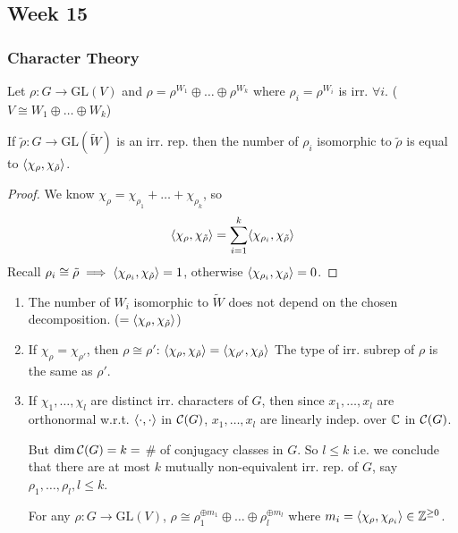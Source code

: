 \subsection{Week 15}
\subsubsection{Character Theory }

\begin{prop}
  Let $\rho: G\to \text{GL}(V)$ and
  $\rho = \rho^{W_1} \oplus \dots \oplus \rho^{W_k}$ where
  $\rho_i = \rho^{W_i}$ is irr. $\forall i$.
  ($V \cong W_1 \oplus\dots\oplus W_k$)

  If $\tilde{\rho}: G\to \text{GL}(\tilde{W})$ is an irr. rep. then the number
  of $\rho_i$ isomorphic to $\tilde{\rho}$ is equal to
  $\langle\chi_\rho, \chi_{\tilde{\rho}}\rangle$.
  \begin{proof}
    We know $\chi_\rho = \chi_{\rho_1} + \dots + \chi_{\rho_k}$, so
    \[
      \langle\chi_\rho, \chi_{\tilde{\rho}}\rangle
      = \sum_{i=1}^k \langle\chi_{\rho_i}, \chi_{\tilde{\rho}}\rangle
    \]
    Recall $\rho_i \cong \tilde{\rho} \implies
    \langle\chi_{\rho_i}, \chi_{\tilde{\rho}}\rangle = 1$, otherwise
    $\langle\chi_{\rho_i}, \chi_{\tilde{\rho}}\rangle = 0$.
  \end{proof}
\end{prop}

\begin{remark} \mbox{}
  \begin{enumerate}
    \item The number of $W_i$ isomorphic to $\tilde{W}$ does not depend
      on the chosen decomposition. ($= \langle\chi_\rho, \chi_{\tilde{\rho}}\rangle$)
    \item If $\chi_\rho = \chi_{\rho'}$, then $\rho \cong \rho'$:
      $\langle\chi_\rho, \chi_{\tilde{\rho}}\rangle = \langle\chi_{\rho'}, \chi_{\tilde{\rho}}\rangle$
      The type of irr. subrep of $\rho$ is the same as $\rho'$.

    \item If $\chi_1, \dots, \chi_l$ are distinct irr. characters of $G$, then
      since $x_1, \dots, x_l$ are orthonormal w.r.t. $\langle\cdot,\cdot\rangle$ in
      $\mathcal{C}(G)$, $x_1, \dots, x_l$ are linearly indep. over $\mathbb{C}$ in $\mathcal{C}(G)$.

      But $\dim \mathcal{C}(G) = k =$ \# of conjugacy classes in $G$. So
      $l \le k$ i.e. we conclude that there are at most $k$ mutually
      non-equivalent irr. rep. of $G$, say $\rho_1, \dots, \rho_l, l \le k$.

      For any $\rho: G\to \text{GL}(V)$,
      $\rho \cong \rho_1^{\oplus m_1} \oplus\dots\oplus\rho_l^{\oplus m_l}$
      where $m_i = \langle\chi_\rho, \chi_{\rho_i}\rangle \in \mathbb{Z}^{\ge 0}$.
  \end{enumerate}
\end{remark}

